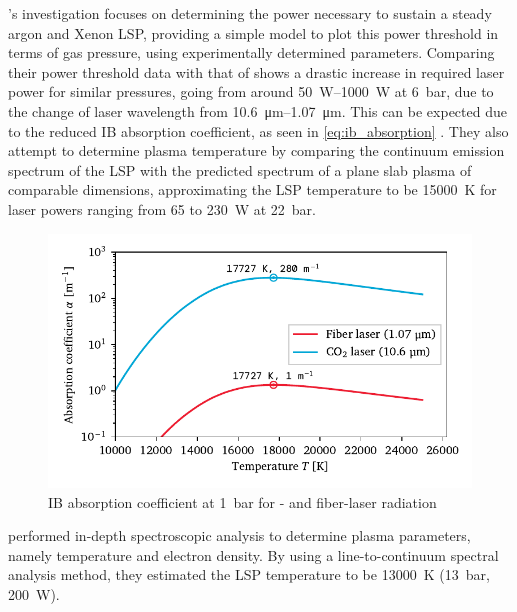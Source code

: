             \textcite{zimakovInteractionNearIRLaser2016}'s investigation focuses on determining the power necessary to sustain a steady argon and Xenon LSP, providing a simple model to plot this power threshold in terms of gas pressure, using experimentally determined parameters. Comparing their power threshold data with that of \textcite{moodyMaintenanceGasBreakdown1975} shows a drastic increase in required laser power for similar pressures, going from around \qtyrange{50}{1000}{W} at \qty{6}{bar}, due to the change of laser wavelength from \qtyrange{10.6}{1.07}{\um}. This can be expected due to the reduced IB absorption coefficient, as seen in \autoref{eq:ib_absorption} . They also attempt to determine plasma temperature by comparing the continuum emission spectrum of the LSP with the predicted spectrum of a plane slab plasma of comparable dimensions, approximating the LSP temperature to be \qty{15000}{K} for laser powers ranging from 65 to \qty{230}{W} at \qty{22}{bar}.

            \begin{figure}[h]
                \centering
                \includegraphics[]{assets/2 background/alphadiff}
                \caption[IB absorption coefficient for - and fiber-laser radiation]{IB absorption coefficient at \qty{1}{bar} for - and fiber-laser radiation}
                \label{fig:alphadiff}
            \end{figure}

            \textcite{luCharacteristicDiagnosticsLaserStabilized2022} performed in-depth spectroscopic analysis to determine plasma parameters, namely temperature and electron density. By using a line-to-continuum spectral analysis method, they estimated the LSP temperature to be \qty{13000}{K} (\qty{13}{bar}, \qty{200}{W}).

